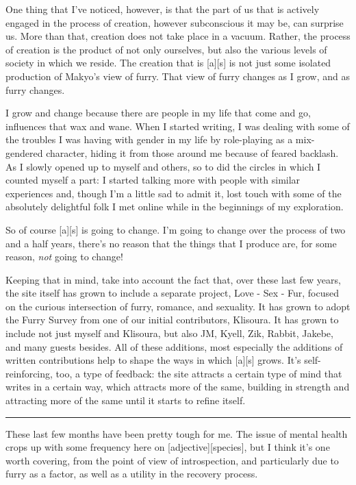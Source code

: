 One thing that I've noticed, however, is that the part of us that is
actively engaged in the process of creation, however subconscious it may
be, can surprise us. More than that, creation does not take place in a
vacuum. Rather, the process of creation is the product of not only
ourselves, but also the various levels of society in which we reside.
The creation that is {[}a{]}{[}s{]} is not just some isolated production
of Makyo's view of furry. That view of furry changes as I grow, and as
furry changes.

I grow and change because there are people in my life that come and go,
influences that wax and wane. When I started writing, I was dealing with
some of the troubles I was having with gender in my life by role-playing
as a mix-gendered character, hiding it from those around me because of
feared backlash. As I slowly opened up to myself and others, so to did
the circles in which I counted myself a part: I started talking more
with people with similar experiences and, though I'm a little sad to
admit it, lost touch with some of the absolutely delightful folk I met
online while in the beginnings of my exploration.

So of course {[}a{]}{[}s{]} is going to change. I'm going to change over
the process of two and a half years, there's no reason that the things
that I produce are, for some reason, \emph{not} going to change!

Keeping that in mind, take into account the fact that, over these last
few years, the site itself has grown to include a separate project, Love
- Sex - Fur, focused on the curious intersection of furry, romance, and
sexuality. It has grown to adopt the Furry Survey from one of our
initial contributors, Klisoura. It has grown to include not just myself
and Klisoura, but also JM, Kyell, Zik, Rabbit, Jakebe, and many guests
besides. All of these additions, most especially the additions of
written contributions help to shape the ways in which {[}a{]}{[}s{]}
grows. It's self-reinforcing, too, a type of feedback: the site attracts
a certain type of mind that writes in a certain way, which attracts more
of the same, building in strength and attracting more of the same until
it starts to refine itself.

\begin{center}\rule{0.5\linewidth}{\linethickness}\end{center}

These last few months have been pretty tough for me. The issue of mental
health crops up with some frequency here on
{[}adjective{]}{[}species{]}, but I think it's one worth covering, from
the point of view of introspection, and particularly due to furry as a
factor, as well as a utility in the recovery process.

